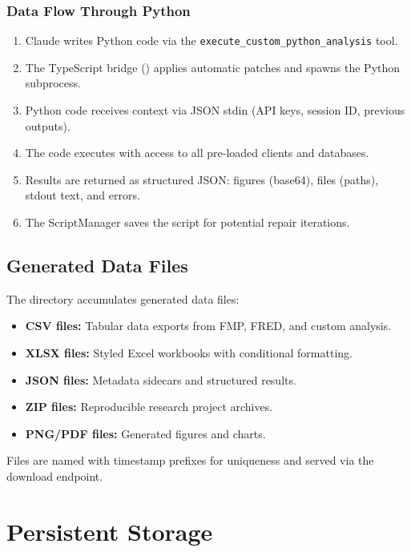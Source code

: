 \subsubsection{Data Flow Through Python}

\begin{enumerate}
  \item Claude writes Python code via the \texttt{execute\_custom\_python\_analysis} tool.
  \item The TypeScript bridge () applies automatic patches and spawns the Python subprocess.
  \item Python code receives context via JSON stdin (API keys, session ID, previous outputs).
  \item The code executes with access to all pre-loaded clients and databases.
  \item Results are returned as structured JSON: figures (base64), files (paths), stdout text, and errors.
  \item The ScriptManager saves the script for potential repair iterations.
\end{enumerate}

\subsection{Generated Data Files}

The  directory accumulates generated data files:

\begin{itemize}
  \item \textbf{CSV files:} Tabular data exports from FMP, FRED, and custom analysis.
  \item \textbf{XLSX files:} Styled Excel workbooks with conditional formatting.
  \item \textbf{JSON files:} Metadata sidecars and structured results.
  \item \textbf{ZIP files:} Reproducible research project archives.
  \item \textbf{PNG/PDF files:} Generated figures and charts.
\end{itemize}

Files are named with timestamp prefixes for uniqueness and served via the download endpoint.

\section{Persistent Storage}
\label{sec:data:persistent}

